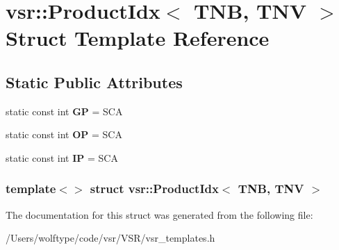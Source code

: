 \hypertarget{structvsr_1_1_product_idx_3_01_t_n_b_00_01_t_n_v_01_4}{\section{vsr\-:\-:Product\-Idx$<$ T\-N\-B, T\-N\-V $>$ Struct Template Reference}
\label{structvsr_1_1_product_idx_3_01_t_n_b_00_01_t_n_v_01_4}
}
\subsection*{Static Public Attributes}
\begin{DoxyCompactItemize}
\item 
\hypertarget{structvsr_1_1_product_idx_3_01_t_n_b_00_01_t_n_v_01_4_ac98211584c8745669bd04548a74fa81f}{static const int {\bfseries G\-P} = S\-C\-A}\label{structvsr_1_1_product_idx_3_01_t_n_b_00_01_t_n_v_01_4_ac98211584c8745669bd04548a74fa81f}

\item 
\hypertarget{structvsr_1_1_product_idx_3_01_t_n_b_00_01_t_n_v_01_4_ab87b9b1b8d65b9f662242f35d3a0666a}{static const int {\bfseries O\-P} = S\-C\-A}\label{structvsr_1_1_product_idx_3_01_t_n_b_00_01_t_n_v_01_4_ab87b9b1b8d65b9f662242f35d3a0666a}

\item 
\hypertarget{structvsr_1_1_product_idx_3_01_t_n_b_00_01_t_n_v_01_4_adbfbb6ec161f3ecf77c905196a88b7bc}{static const int {\bfseries I\-P} = S\-C\-A}\label{structvsr_1_1_product_idx_3_01_t_n_b_00_01_t_n_v_01_4_adbfbb6ec161f3ecf77c905196a88b7bc}

\end{DoxyCompactItemize}
\subsubsection*{template$<$$>$ struct vsr\-::\-Product\-Idx$<$ T\-N\-B, T\-N\-V $>$}



The documentation for this struct was generated from the following file\-:\begin{DoxyCompactItemize}
\item 
/\-Users/wolftype/code/vsr/\-V\-S\-R/vsr\-\_\-templates.\-h\end{DoxyCompactItemize}
